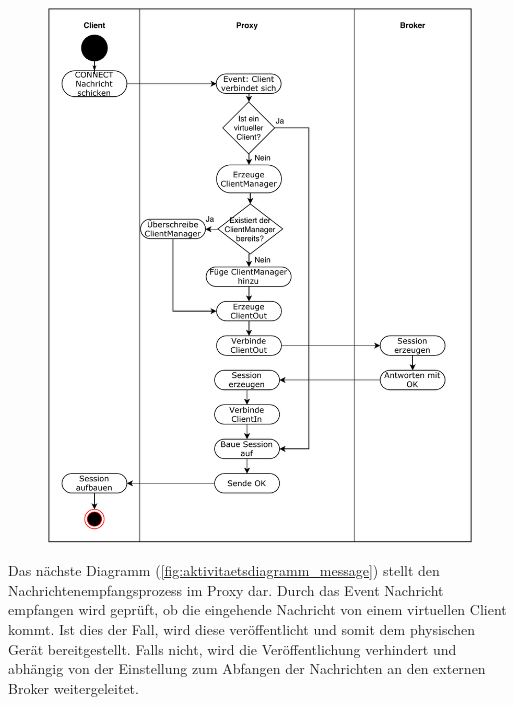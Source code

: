    \begin{figure}[!h]%
        \centering
        \includegraphics[width=14cm]{tex/bilder/4_konzept/Activity_Connect.pdf}
        \label{fig:aktivitaetsdiagramm_connect}
    \end{figure}
    \newpage
    Das nächste Diagramm (\ref{fig:aktivitaetsdiagramm_message}) stellt den Nachrichtenempfangsprozess im Proxy dar.
    Durch das Event \glqq Nachricht empfangen\grqq{} wird geprüft, ob die eingehende Nachricht von einem virtuellen Client kommt. Ist dies der Fall, wird diese veröffentlicht und somit dem physischen Gerät bereitgestellt. Falls nicht, wird die Veröffentlichung verhindert und abhängig von der Einstellung zum Abfangen der Nachrichten an den externen Broker weitergeleitet.
    
